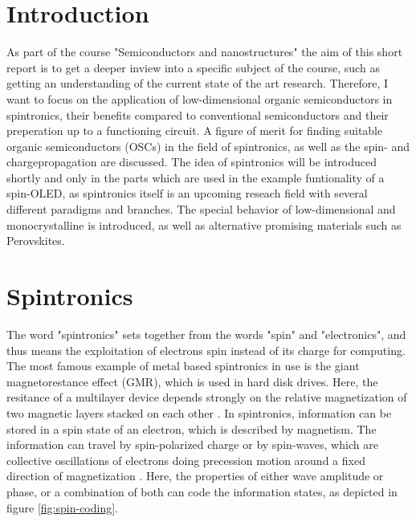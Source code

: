 


\section{Introduction}
\label{sec:Introduction}
As part of the course "Semiconductors and nanostructures" the aim of this short report is to get a deeper inview into a specific subject of the course, such as getting an understanding of the current state of the art research.
Therefore, I want to focus on the application of low-dimensional organic semiconductors in spintronics, their benefits compared to conventional semiconductors and their preperation up to a functioning circuit.
A figure of merit for finding suitable organic semiconductors (OSCs) in the field of spintronics, as well as the spin- and chargepropagation are discussed.
The idea of spintronics will be introduced shortly and only in the parts which are used in the example funtionality of a spin-OLED, as spintronics itself is an upcoming reseach field with several different paradigms and branches.
The special behavior of low-dimensional and monocrystalline is introduced, as well as alternative promising materials such as Perovskites.

\section{Spintronics}
\label{sec:spintronics}

The word "spintronics" sets together from the words "spin" and "electronics", and thus means the exploitation of electrons spin instead of its charge for computing.
The most famous example of metal based spintronics in use is the giant magnetorestance effect (GMR), which is used in hard disk drives.
Here, the resitance of a multilayer device depends strongly on the relative magnetization of two magnetic layers stacked on each other \cite{perovskite}.
In spintronics, information can be stored in a spin state of an electron, which is described by magnetism.
The information can travel by spin-polarized charge or by spin-waves, which are collective oscillations of electrons doing precession motion around a fixed direction of magnetization \cite{clocks}.
Here, the properties of either wave amplitude or phase, or a combination of both can code the information states, as depicted in figure \ref{fig:spin-coding}.

